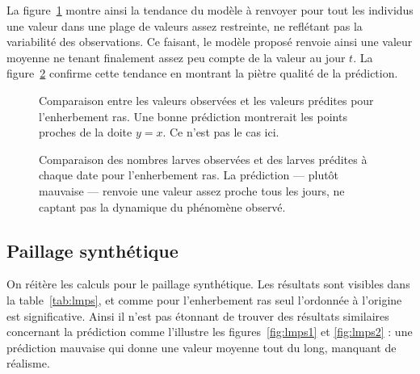 \documentclass[a4paper, 11pt]{article}
\begin{document}
La figure~\ref{fig:lmer1} montre ainsi la tendance du modèle à renvoyer pour tout les individus une valeur dans une plage de valeurs assez restreinte, ne reflétant pas la variabilité des observations. Ce faisant, le modèle proposé renvoie ainsi une valeur moyenne ne tenant finalement assez peu compte de la valeur au jour $t$. La figure~\ref{fig:lmer2} confirme cette tendance en montrant la piètre qualité de la prédiction.

\begin{figure}[ht]
 \centering
 \caption{Comparaison entre les valeurs observées et les valeurs prédites pour l'enherbement ras. Une bonne prédiction montrerait les points proches de la doite $y=x$. Ce n'est pas le cas ici.}
 \label{fig:lmer1}
\end{figure}

\begin{figure}[ht]
 \centering
 \caption{Comparaison des nombres larves observées et des larves prédites à chaque date pour l'enherbement ras. La prédiction --- plutôt mauvaise --- renvoie une valeur assez proche tous les jours, ne captant  pas la dynamique du phénomène observé.}
 \label{fig:lmer2}
\end{figure}

\subsection{Paillage synthétique}

On réitère les calculs pour le paillage synthétique. Les résultats sont visibles dans la table~\ref{tab:lmps}, et comme pour l'enherbement ras seul l'ordonnée à l'origine est significative. Ainsi il n'est pas étonnant de trouver des résultats similaires concernant la prédiction comme l'illustre les figures~\ref{fig:lmps1} et \ref{fig:lmps2} : une prédiction mauvaise qui donne une valeur moyenne tout du long, manquant de réalisme.
\end{document}
